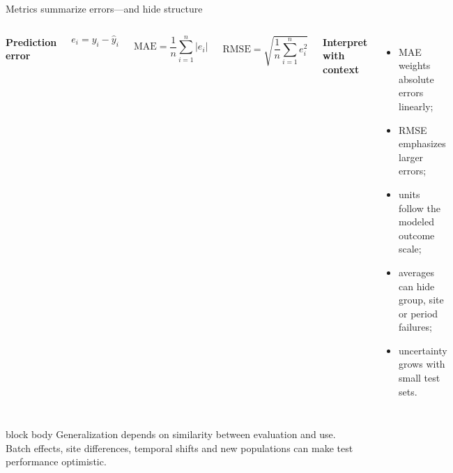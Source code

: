\documentclass[10pt,aspectratio=169]{beamer}
\begin{document}
\begin{frame}{Metrics summarize errors---and hide structure}

\small

\begin{columns}[T]


\textbf{Prediction error}

\[
e_i = y_i - \hat{y}_i
\]

\[
\mathrm{MAE}=\frac{1}{n}\sum_{i=1}^{n}|e_i|
\]

\[
\mathrm{RMSE}=\sqrt{\frac{1}{n}\sum_{i=1}^{n}e_i^2}
\]


\textbf{Interpret with context}

\begin{itemize}
  \item MAE weights absolute errors linearly;
  \item RMSE emphasizes larger errors;
  \item units follow the modeled outcome scale;
  \item averages can hide group, site or period failures;
  \item uncertainty grows with small test sets.
\end{itemize}

\end{columns}

\vspace{0.25cm}

\begin{beamercolorbox}[rounded=true,sep=8pt]{block body}
Generalization depends on similarity between evaluation and use. Batch effects, site differences, temporal shifts and new populations can make test performance optimistic.
\end{beamercolorbox}

\end{frame}
\end{document}
